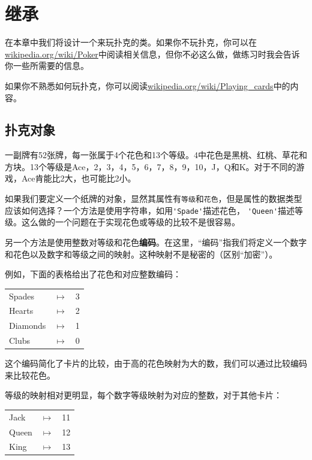 \chapter{继承}

在本章中我们将设计一个来玩扑克的类。如果你不玩扑克，你可以在\url{wikipedia.org/wiki/Poker}中阅读相关信息，但你不必这么做，做练习时我会告诉你一些所需要的信息。


如果你不熟悉如何玩扑克，你可以阅读\url{wikipedia.org/wiki/Playing_cards}中的内容。


\section{扑克对象}

一副牌有52张牌，每一张属于4个花色和13个等级。4中花色是黑桃、红桃、草花和方块。13个等级是Ace，2，3，4，5，6，7，8，9，10，J，Q和K。对于不同的游戏，Ace肯能比2大，也可能比2小。


如果我们要定义一个纸牌的对象，显然其属性有{\tt 等级}和{\tt 花色}，但是属性的数据类型应该如何选择？一个方法是使用字符串，如用\verb"'Spade'"描述花色， \verb"'Queen'"描述等级。这么做的一个问题在于实现花色或等级的比较不是很容易。


另一个方法是使用整数对等级和花色{\bf 编码}。在这里，“编码”指我们将定义一个数字和花色以及数字和等级之间的映射。这种映射不是秘密的（区别“加密”）。

例如，下面的表格给出了花色和对应整数编码：

\beforefig
\begin{tabular}{l c l}
Spades & $\mapsto$ & 3 \\
Hearts & $\mapsto$ & 2 \\
Diamonds & $\mapsto$ & 1 \\
Clubs & $\mapsto$ & 0
\end{tabular}
\afterfig

这个编码简化了卡片的比较，由于高的花色映射为大的数，我们可以通过比较编码来比较花色。

等级的映射相对更明显，每个数字等级映射为对应的整数，对于其他卡片：

\beforefig
\begin{tabular}{l c l}
Jack & $\mapsto$ & 11 \\
Queen & $\mapsto$ & 12 \\
King & $\mapsto$ & 13 \\
\end{tabular}
\afterfig

